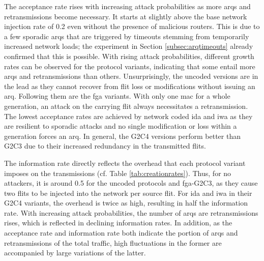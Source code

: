 The acceptance rate rises with increasing attack probabilities as more \glspl{arq} and retransmissions become necessary. It starts at slightly
above the base network injection rate of 0.2 even without the presence of malicious routers. This is due to a few sporadic \glspl{arq} that are
triggered by timeouts stemming from temporarily increased network loads; the experiment in Section \ref{subsec:arqtimeouts} already confirmed that
this is possible. With rising attack probabilities, different growth rates can be observed for the protocol variants, indicating that some entail more
\glspl{arq} and retransmissions than others. Unsurprisingly, the uncoded versions are in the lead as they cannot recover from flit loss or
modifications without issuing an \gls{arq}. Following them are the \gls{fga} variants. With only one \gls{mac} for a whole generation, an attack on
the carrying flit always necessitates a retransmission. The lowest acceptance rates are achieved by network coded \gls{ida} and \gls{iwa} as they are
resilient to sporadic attacks and no single modification or loss within a generation forces an \gls{arq}. In general, the G2C4 versions perform better
than G2C3 due to their increased redundancy in the transmitted flits.

The information rate directly reflects the overhead that each protocol variant imposes on the transmissions (cf. Table \ref{tab:creationrates}). Thus,
for no attackers, it is around 0.5 for the uncoded protocols and \gls{fga}-G2C3, as they cause two flits to be injected into the network per source
flit. For \gls{ida} and \gls{iwa} in their G2C4 variants, the overhead is twice as high, resulting in half the information rate. With increasing
attack probabilities, the number of \glspl{arq} are retransmissions rises, which is reflected in declining information rates. In addition, as the
acceptance rate and information rate both indicate the portion of \glspl{arq} and retransmissions of the total traffic, high fluctuations in the
former are accompanied by large variations of the latter.

